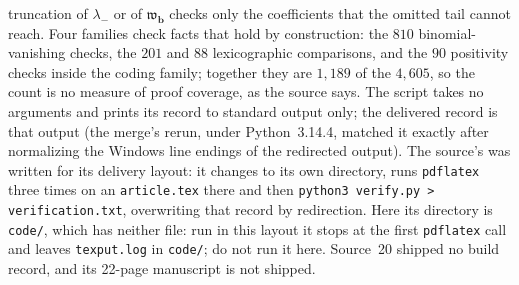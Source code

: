\documentclass[11pt]{article}
\numberwithin{equation}{section}
\theoremstyle{definition}
\theoremstyle{remark}
\begin{document}
truncation of $\lambda_-$ or of $\mathfrak w_{\mathbf b}$ checks only the
coefficients that the omitted tail cannot reach. Four families check facts
that hold by construction: the $810$ binomial-vanishing checks, the $201$ and
$88$ lexicographic comparisons, and the $90$ positivity checks inside the
coding family; together they are $1{,}189$ of the $4{,}605$, so the count is no
measure of proof coverage, as the source says. The script takes no arguments
and prints its record to standard output only; the delivered record is that
output (the merge's rerun, under Python~3.14.4, matched it exactly after
normalizing the Windows line endings of the redirected output). The source's
 was written for its delivery layout: it
changes to its own directory, runs \texttt{pdflatex} three times on an
\texttt{article.tex} there and then \texttt{python3 verify.py >
verification.txt}, overwriting that record by redirection. Here its directory
is \texttt{code/}, which has neither file: run in this layout it stops at the
first \texttt{pdflatex} call and leaves \texttt{texput.log} in \texttt{code/};
do not run it here. Source~20 shipped no build record, and its 22-page
manuscript is not shipped.
\end{document}
